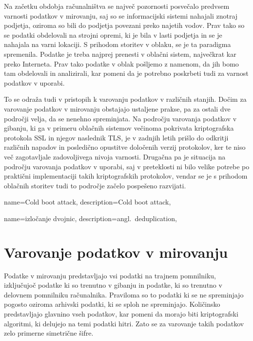 \documentclass[12pt,a4paper,openany]{book}
\begin{document}
Na začetku obdobja računalništva se največ pozornosti posvečalo predvsem varnosti podatkov v mirovanju, saj so se informacijski sistemi nahajali znotraj podjetja, oziroma so bili do podjetja povezani preko najetih vodov. Prav tako so se podatki obdelovali na strojni opremi, ki je bila v lasti podjetja in se je nahajala na varni lokaciji. S prihodom storitev v oblaku, se je ta paradigma spremenila. Podatke je treba najprej prenesti v oblačni sistem, največkrat kar preko Interneta. Prav tako podatke v oblak pošljemo z namenom, da jih bomo tam obdelovali in analizirali, kar pomeni da je potrebno poskrbeti tudi za varnost podatkov v uporabi.


To se odraža tudi v pristopih k varovanju podatkov v različnih stanjih. Dočim za varovanje podatkov v mirovanju obstajajo ustaljene prakse, pa za ostali dve področji velja, da se nenehno spreminjata. Na področju varovanja podatkov v gibanju, ki ga v primeru oblačnih sistemov večinoma pokrivata kriptografska protokola \acrfull{SSL} in njegov naslednik \acrfull{TLS}, je v zadnjih letih prišlo do odkritji različnih napadov in posledično opustitve določenih verzij protokolov, ker te niso več zagotavljale zadovoljivega nivoja varnosti. Drugačna pa je situacija na področju varovanja podatkov v uporabi, saj v preteklosti ni bilo velike potrebe po praktični implementaciji takih kriptografskih protokolov, vendar se je s prihodom oblačnih storitev tudi to področje začelo pospešeno razvijati.


{
  name=Cold boot attack,
  description={Cold boot attack},
}

{
  name=izločanje dvojnic,
  description={angl.\ deduplication},
}

\section{Varovanje podatkov v mirovanju}
\label{subs:Varovanje podatkov v mirovanju}

Podatke v mirovanju predstavljajo vsi podatki na trajnem pomnilniku, izključujoč podatke ki so trenutno v gibanju in podatke, ki so trenutno v delovnem pomnilniku računalnika. Praviloma so to podatki ki se ne spreminjajo pogosto oziroma arhivski podatki, ki se sploh ne spreminjajo. Količinsko predstavljajo glavnino vseh podatkov, kar pomeni da morajo biti kriptografski algoritmi, ki delujejo na temi podatki hitri. Zato se za varovanje takih podatkov zelo primerne simetrične šifre.
\end{document}
